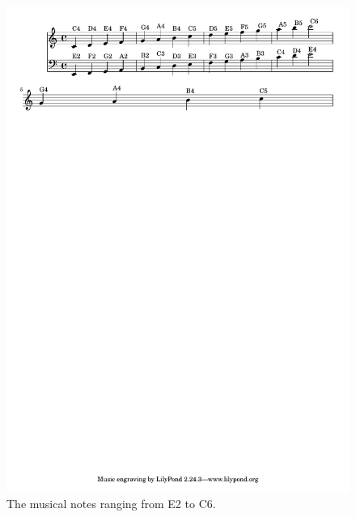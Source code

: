 \documentclass[11pt]{article}
\theoremstyle{definition}
\begin{document}
\begin{figure}
\centering
\includegraphics[trim=1cm 25cm 0cm 0.02cm, clip, scale=0.8]{pitchesonstaff.pdf} %
\caption{The musical notes ranging from E2 to C6.}
\label{fig:musical note} 
\end{figure}
\end{document}
